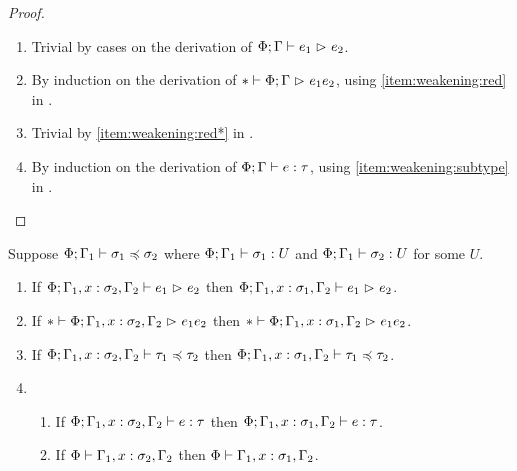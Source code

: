 \begin{proof} \hfill
\begin{enumerate}[noitemsep]
  \item Trivial by cases on the derivation of $\Phi; \Gamma \mathrel{\vdash} e_1 \mathrel{\rhd}_{} e_2$.
  \item By induction on the derivation of $* \mathrel{\vdash} \Phi; \Gamma \mathrel{\rhd}_{} e_1{e_2}$,
    using \cref{item:weakening:red} in .
  \item Trivial by \cref{item:weakening:red*} in .
  \item By induction on the derivation of $\Phi; \Gamma \mathrel{\vdash} e \mathrel{:} \tau$,
    using \cref{item:weakening:subtype} in . \qedhere
\end{enumerate}
\end{proof}

\begin{lemma} \label{lem:replacement-subtyping}
Suppose $\Phi; \Gamma_1 \mathrel{\vdash} \sigma_1 \mathrel{\preccurlyeq} \sigma_2$ where
$\Phi; \Gamma_1 \mathrel{\vdash} \sigma_1 \mathrel{:} U$ and $\Phi; \Gamma_1 \mathrel{\vdash} \sigma_2 \mathrel{:} U$
for some $U$.
\begin{enumerate}[noitemsep]
  \item \label{item:replacement-subtyping:red}
    If $\Phi; \Gamma_1, x \mathrel{:} \sigma_2, \Gamma_2 \mathrel{\vdash} e_1 \mathrel{\rhd}_{} e_2$
    then $\Phi; \Gamma_1, x \mathrel{:} \sigma_1, \Gamma_2 \mathrel{\vdash} e_1 \mathrel{\rhd}_{} e_2$.
  \item \label{item:replacement-subtyping:red*}
    If $* \mathrel{\vdash} \Phi; \Gamma_1, x \mathrel{:} \sigma_2, \Gamma_2 \mathrel{\rhd}_{} e_1{e_2}$
    then $* \mathrel{\vdash} \Phi; \Gamma_1, x \mathrel{:} \sigma_1, \Gamma_2 \mathrel{\rhd}_{} e_1{e_2}$.
  \item \label{item:replacement-subtyping:subtyping}
    If $\Phi; \Gamma_1, x \mathrel{:} \sigma_2, \Gamma_2 \mathrel{\vdash} \tau_1 \mathrel{\preccurlyeq} \tau_2$
    then $\Phi; \Gamma_1, x \mathrel{:} \sigma_1, \Gamma_2 \mathrel{\vdash} \tau_1 \mathrel{\preccurlyeq} \tau_2$.
  \item
    \begin{enumerate}[noitemsep]
      \item \label{item:replacement-subtyping:typing} If $\Phi; \Gamma_1, x \mathrel{:} \sigma_2, \Gamma_2 \mathrel{\vdash} e \mathrel{:} \tau$
        then $\Phi; \Gamma_1, x \mathrel{:} \sigma_1, \Gamma_2 \mathrel{\vdash} e \mathrel{:} \tau$.
      \item \label{item:replacement-subtyping:wf} If $\Phi \mathrel{\vdash} \Gamma_1, x \mathrel{:} \sigma_2, \Gamma_2$
        then $\Phi \mathrel{\vdash} \Gamma_1, x \mathrel{:} \sigma_1, \Gamma_2$.
    \end{enumerate}
\end{enumerate}
\end{lemma}


